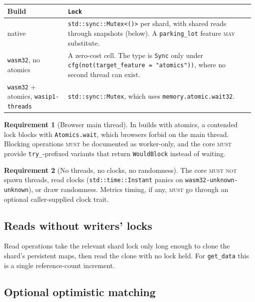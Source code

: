\documentclass[11pt]{article}
\theoremstyle{plain}
\theoremstyle{definition}
\newtheorem{requirement}{Requirement}
\newcommand{\MUST}{\textsc{must}}
\newcommand{\MUSTNOT}{\textsc{must not}}
\newcommand{\MAY}{\textsc{may}}
\newcommand{\code}[1]{\texttt{#1}}
\begin{document}
\begin{center}
\begin{tabularx}{\linewidth}{@{}lX@{}}
\toprule
Build & \code{Lock}\\
\midrule
native & \code{std::sync::Mutex<()>} per shard, with shared reads through snapshots (below). A \code{parking\_lot} feature \MAY{} substitute.\\
\code{wasm32}, no atomics & A zero-cost cell. The type is \code{Sync} only under \code{cfg(not(target\_feature = "atomics"))}, where no second thread can exist.\\
\code{wasm32} + atomics, \code{wasip1-threads} & \code{std::sync::Mutex}, which uses \code{memory.atomic.wait32}.\\
\bottomrule
\end{tabularx}
\end{center}

\begin{requirement}[Browser main thread]
In builds with atomics, a contended lock blocks with \code{Atomics.wait}, which
browsers forbid on the main thread. Blocking operations \MUST{} be documented as
worker-only, and the core \MUST{} provide \code{try\_}-prefixed variants that return
\code{WouldBlock} instead of waiting.
\end{requirement}

\begin{requirement}[No threads, no clocks, no randomness]
The core \MUSTNOT{} spawn threads, read clocks (\code{std::time::Instant} panics on
\code{wasm32-unknown-unknown}), or draw randomness. Metrics timing, if any, \MUST{}
go through an optional caller-supplied clock trait.
\end{requirement}

\subsection{Reads without writers' locks}

Read operations take the relevant shard lock only long enough to clone the shard's
persistent maps, then read the clone with no lock held. For \code{get\_data} this is
a single reference-count increment.

\subsection{Optional optimistic matching}
\end{document}
